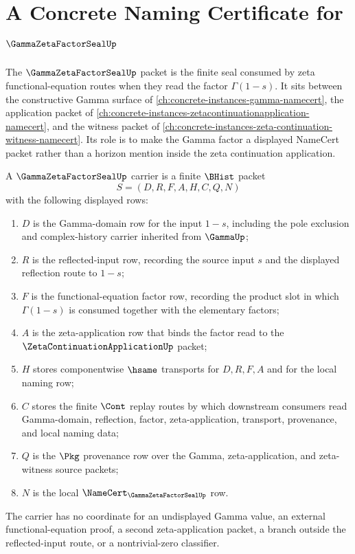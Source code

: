 \chapter{A Concrete Naming Certificate for $\GammaZetaFactorSealUp$}
\label{ch:concrete-instances-gammazetafactorseal-namecert}

The $\GammaZetaFactorSealUp$ packet is the finite seal consumed by zeta
functional-equation routes when they read the factor $\Gamma(1-s)$. It sits
between the constructive Gamma surface of \autoref{ch:concrete-instances-gamma-namecert},
the application packet of
\autoref{ch:concrete-instances-zetacontinuationapplication-namecert}, and the
witness packet of \autoref{ch:concrete-instances-zeta-continuation-witness-namecert}.
Its role is to make the Gamma factor a displayed NameCert packet rather than a
horizon mention inside the zeta continuation application.

\begin{definition}
\label{def:gamma-zeta-factor-seal-carrier}
A $\GammaZetaFactorSealUp$ carrier is a finite $\BHist$ packet
$$
S=(D,R,F,A,H,C,Q,N)
$$
with the following displayed rows:
\begin{enumerate}
\item $D$ is the Gamma-domain row for the input $1-s$, including the pole
exclusion and complex-history carrier inherited from $\GammaUp$;
\item $R$ is the reflected-input row, recording the source input $s$ and the
displayed reflection route to $1-s$;
\item $F$ is the functional-equation factor row, recording the product slot in
which $\Gamma(1-s)$ is consumed together with the elementary factors;
\item $A$ is the zeta-application row that binds the factor read to the
$\ZetaContinuationApplicationUp$ packet;
\item $H$ stores componentwise $\hsame$ transports for $D,R,F,A$ and for the
local naming row;
\item $C$ stores the finite $\Cont$ replay routes by which downstream consumers
read Gamma-domain, reflection, factor, zeta-application, transport, provenance,
and local naming data;
\item $Q$ is the $\Pkg$ provenance row over the Gamma, zeta-application, and
zeta-witness source packets;
\item $N$ is the local $\NameCert_{\GammaZetaFactorSealUp}$ row.
\end{enumerate}
The carrier has no coordinate for an undisplayed Gamma value, an external
functional-equation proof, a second zeta-application packet, a branch outside
the reflected-input route, or a nontrivial-zero classifier.
\end{definition}

